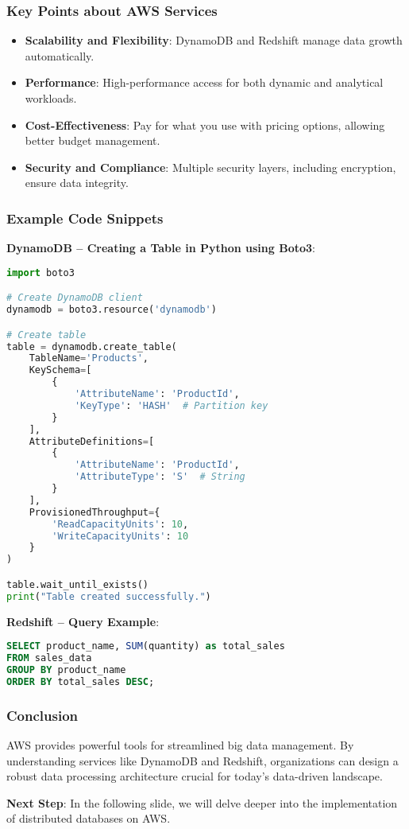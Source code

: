 \documentclass[aspectratio=169]{beamer}
\begin{document}
\begin{frame}[fragile]
    \frametitle{Key Points about AWS Services}
    \begin{itemize}
        \item \textbf{Scalability and Flexibility}: DynamoDB and Redshift manage data growth automatically.
        \item \textbf{Performance}: High-performance access for both dynamic and analytical workloads.
        \item \textbf{Cost-Effectiveness}: Pay for what you use with pricing options, allowing better budget management.
        \item \textbf{Security and Compliance}: Multiple security layers, including encryption, ensure data integrity.
    \end{itemize}
\end{frame}

\begin{frame}[fragile]
    \frametitle{Example Code Snippets}
    \textbf{DynamoDB – Creating a Table in Python using Boto3}:
    \begin{lstlisting}[language=Python]
import boto3

# Create DynamoDB client
dynamodb = boto3.resource('dynamodb')

# Create table
table = dynamodb.create_table(
    TableName='Products',
    KeySchema=[
        {
            'AttributeName': 'ProductId',
            'KeyType': 'HASH'  # Partition key
        }
    ],
    AttributeDefinitions=[
        {
            'AttributeName': 'ProductId',
            'AttributeType': 'S'  # String
        }
    ],
    ProvisionedThroughput={
        'ReadCapacityUnits': 10,
        'WriteCapacityUnits': 10
    }
)

table.wait_until_exists()
print("Table created successfully.")
    \end{lstlisting}

    \textbf{Redshift – Query Example}:
    \begin{lstlisting}[language=SQL]
SELECT product_name, SUM(quantity) as total_sales
FROM sales_data
GROUP BY product_name
ORDER BY total_sales DESC;
    \end{lstlisting}
\end{frame}

\begin{frame}
    \frametitle{Conclusion}
    AWS provides powerful tools for streamlined big data management. By understanding services like DynamoDB and Redshift, organizations can design a robust data processing architecture crucial for today's data-driven landscape.

    \textbf{Next Step}: In the following slide, we will delve deeper into the implementation of distributed databases on AWS.
\end{frame}
\end{document}
